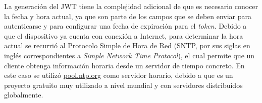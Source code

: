 
La generación del JWT tiene la complejidad adicional de que es necesario conocer la fecha y hora actual, ya que son parte de los campos que se deben enviar para autenticarse y para configurar una fecha de expiración para el \emph{token}. Debido a que el dispositivo ya cuenta con conexión a Internet, para determinar la hora actual se recurrió al Protocolo Simple de Hora de Red (SNTP, por sus siglas en inglés correspondientes a \emph{Simple Network Time Protocol}), el cual permite que un cliente obtenga información horaria desde un servidor de tiempo concreto. En este caso se utilizó \url{pool.ntp.org} como servidor horario, debido a que es un proyecto gratuito muy utilizado a nivel mundial y con servidores distribuidos globalmente. 


















